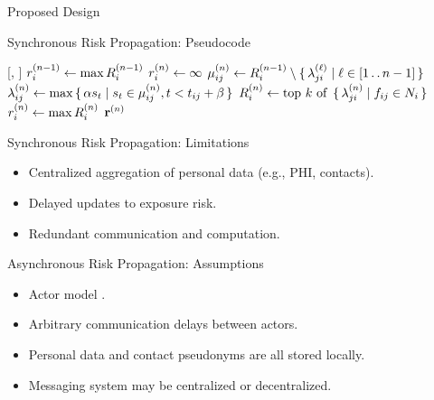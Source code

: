\documentclass[11pt]{beamer}
\begin{document}
\begin{section}{Proposed Design}
\begin{frame}{Synchronous Risk Propagation: Pseudocode}
\begin{function}{\nRiskPropagation}[\vScores, \vContacts]
  \pause
  \State $r_{i}^{(n - 1)} \leftarrow \max R_{i}^{(n - 1)}$
  \pause
  \State $r_{i}^{(n)} \leftarrow \infty$
  \pause
  \pause
    \State $\mu_{ij}^{(n)} \leftarrow R_{i}^{(n - 1)} \setminus \set{ \lambda_{ji}^{(\ell)} | \ell \in [1 \mathinner{\ldotp \ldotp} n - 1]}$
    \pause
    \State $\lambda_{ij}^{(n)} \leftarrow \max \set{ \alpha s_t| s_t\in \mu_{ij}^{(n)}, t< t_{ij} + \beta}$
    \pause
    \State $\vRiskScores{i}{n} \assign \topK{\setBuilder{\vFactorMessage{j}{i}{n}}{\vFactor[ij] \in \vNeighbors_i}}$
    \pause
    \State $r_{i}^{(n)} \leftarrow \max R_{i}^{(n)}$
    \pause
  \EndWhile
  \State \Return $\mathbf{r}^{(n)}$
\end{function}
\end{frame}

\begin{frame}{Synchronous Risk Propagation: Limitations}
\begin{itemize}
  \item Centralized aggregation of personal data (e.g., PHI, contacts).
  \pause
  \item Delayed updates to exposure risk.
  \pause
  \item Redundant communication and computation.
\end{itemize}
\end{frame}

\begin{frame}{Asynchronous Risk Propagation: Assumptions}
\begin{itemize}
  \item Actor model \citep{Hewitt1973, Hewitt1977a, Hewitt1977b, Agha1985}.
  \pause
  \item Arbitrary communication delays between actors.
  \pause
  \item Personal data and contact pseudonyms are all stored locally.
  \pause
  \item Messaging system may be centralized or decentralized.
\end{itemize}
\end{frame}


\end{section}
\end{document}
